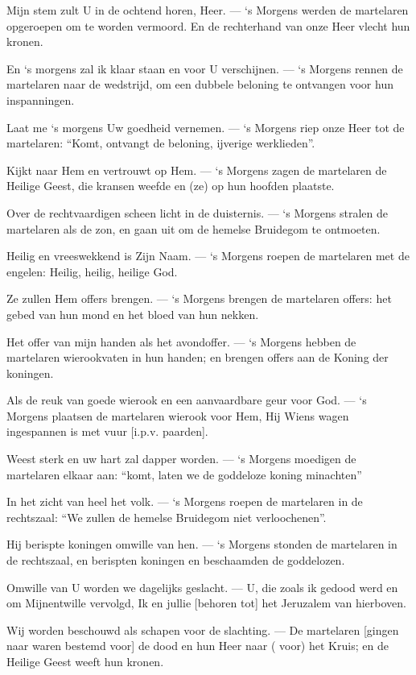 \documentclass[12pt,twoside,a5paper]{article}
\begin{document}
\begin{halfparskip}
   Mijn stem zult U in de ochtend horen, Heer. --- `s Morgens werden de martelaren opgeroepen om te worden vermoord. En de rechterhand van onze Heer vlecht hun kronen.

  En `s morgens zal ik klaar staan en voor U verschijnen. --- `s Morgens rennen de martelaren naar de wedstrijd, om een dubbele beloning te ontvangen voor hun inspanningen.

  Laat me `s morgens Uw goedheid vernemen. --- `s Morgens riep onze Heer tot de martelaren: ``Komt, ontvangt de beloning, ijverige werklieden''.

  Kijkt naar Hem en vertrouwt op Hem. --- `s Morgens zagen de martelaren de Heilige Geest, die kransen weefde en (ze) op hun hoofden plaatste.

  Over de rechtvaardigen scheen licht in de duisternis. --- `s Morgens stralen de martelaren als de zon, en gaan uit om de hemelse Bruidegom te ontmoeten.

  Heilig en vreeswekkend is Zijn Naam. --- `s Morgens roepen de martelaren met de engelen: Heilig, heilig, heilige God.

  Ze zullen Hem offers brengen. --- `s Morgens brengen de martelaren offers: het gebed van hun mond en het bloed van hun nekken.

  Het offer van mijn handen als het avondoffer. --- `s Morgens hebben de martelaren wierookvaten in hun handen; en brengen offers aan de Koning der koningen.

  Als de reuk van goede wierook en een aanvaardbare geur voor God. --- `s Morgens plaatsen de martelaren wierook voor Hem, Hij Wiens wagen ingespannen is met vuur [i.p.v. paarden].

  Weest sterk en uw hart zal dapper worden. --- `s Morgens moedigen de martelaren elkaar aan: ``komt, laten we de goddeloze koning minachten''

  In het zicht van heel het volk. --- `s Morgens roepen de martelaren in de rechtszaal: ``We zullen de hemelse Bruidegom niet verloochenen''.

  Hij berispte koningen omwille van hen. --- `s Morgens stonden de martelaren in de rechtszaal, en berispten koningen en beschaamden de goddelozen.

  Omwille van U worden we dagelijks geslacht. --- U, die zoals ik gedood werd en om Mijnentwille vervolgd, Ik en jullie [behoren tot] het Jeruzalem van hierboven.

  Wij worden beschouwd als schapen voor de slachting. --- De martelaren [gingen naar  waren bestemd voor] de dood en hun Heer naar ( voor) het Kruis; en de Heilige Geest weeft hun kronen.


\end{halfparskip}
\end{document}
